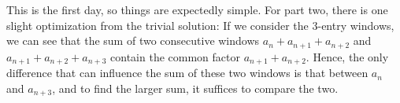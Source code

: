 This is the first day, so things are expectedly simple. For part two, there is one slight optimization from the trivial solution: If we consider the 3-entry windows, we can see that the sum of two consecutive windows $a_n + a_{n+1} + a_{n+2}$ and $a_{n+1} + a_{n+2} + a_{n+3}$ contain the common factor $a_{n+1} + a_{n+2}$. Hence, the only difference that can influence the sum of these two windows is that between $a_n$ and $a_{n+3}$, and to find the larger sum, it suffices to compare the two.